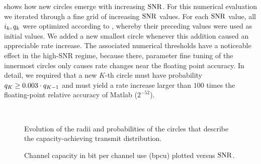  shows how new circles emerge with increasing $\mathrm{SNR}$. For this numerical evaluation we iterated through a fine grid of increasing $\mathrm{SNR}$ values. For each $\mathrm{SNR}$ value, all $i_k , q_k$ were optimized according to , whereby their preceding values were used as initial values. We added a new smallest circle whenever this addition caused an appreciable rate increase. The associated numerical thresholds have a noticeable effect in the high-SNR regime, because there, parameter fine tuning of the innermost circles only causes rate changes near the floating point accuracy. In detail, we required that a new $K$-th circle must have probability $q_K \geq 0.003 \cdot q_{K-1}$ and must yield a rate increase larger than $100$ times the floating-point relative accuracy of Matlab ($2^{-52}$). %


\begin{figure}[t]
\centering
{}
\
\caption{Evolution of the radii and probabilities of the circles that describe the capacity-achieving transmit distribution.}
\label{fig:Radii_PMF_evolution}
\end{figure}

\begin{figure}[t]
\centering
\resizebox{.96\columnwidth}{!}{}%
\caption{Channel capacity in bit per channel use (bpcu) plotted versus $\mathrm{SNR}$.} %
\label{fig:Rates_Capacity}
\end{figure}

